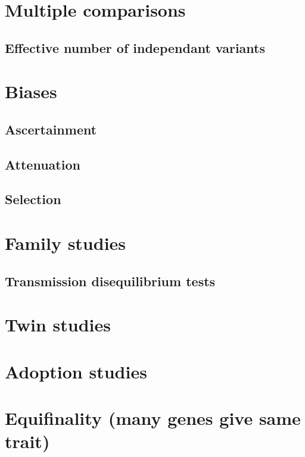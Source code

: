 \documentclass[]{book}
\theoremstyle{definition}
\theoremstyle{definition}
\theoremstyle{definition}
\theoremstyle{remark}
\begin{document}
\section{Multiple comparisons}\label{multiple-comparisons}

\subsection{Effective number of independant
variants}\label{effective-number-of-independant-variants}

\section{Biases}\label{biases}

\subsection{Ascertainment}\label{ascertainment}

\subsection{Attenuation}\label{attenuation}

\subsection{Selection}\label{selection}

\section{Family studies}\label{family-studies}

\subsection{Transmission disequilibrium
tests}\label{transmission-disequilibrium-tests}

\section{Twin studies}\label{twin-studies-1}

\section{Adoption studies}\label{adoption-studies}

\section{Equifinality (many genes give same
trait)}\label{equifinality-many-genes-give-same-trait}
\end{document}
